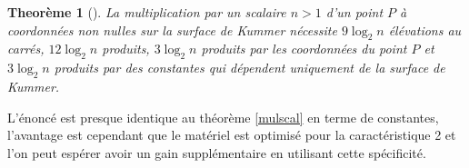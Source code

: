 \documentclass[a4paper,12pt]{article}
\newtheorem{theoreme}{Theorème}[section]
\theoremstyle{definition}
\theoremstyle{remark}
\numberwithin{equation}{section}
\begin{document}
\begin{theoreme}[\citep{lubicz}]
La multiplication par un scalaire $n > 1$ d'un point $P$ à coordonnées non nulles sur la surface de Kummer nécessite $9\log_2 n$ élévations au carrés, $12\log_2 n$ produits, $3\log_2 n$ produits par les coordonnées du point $P$ et $3\log_2 n$ produits par des constantes qui dépendent uniquement de la surface de Kummer.
\end{theoreme}

L'énoncé est presque identique au théorème \ref{mulscal} en terme de constantes, l'avantage est cependant que le matériel est optimisé pour la caractéristique 2 et l'on peut espérer avoir un gain supplémentaire en utilisant cette spécificité.





\end{document}
